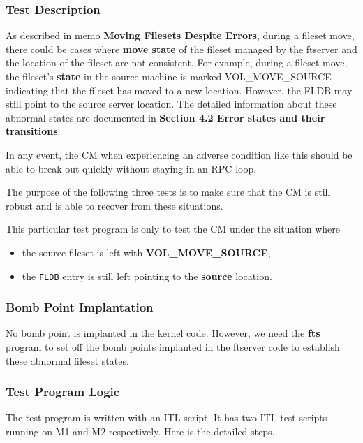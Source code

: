 \subsubsection {Test Description}

As described in memo {\bf Moving Filesets Despite Errors}, during a fileset
move, there could be cases where {\bf move state} of the fileset managed by the
ftserver and the location of the fileset are not consistent. 
For example, during a fileset move, the fileset's {\bf state } in the 
source machine is 
marked VOL_MOVE_SOURCE indicating that the fileset has moved to a new location.
However, the FLDB may still point to the source server location. 
The detailed information about these abnormal states are documented in 
{\bf Section 4.2 Error states and their transitions}.

In any event, the CM when experiencing an adverse condition like this 
should be able to break out quickly without staying in an RPC loop. 

The purpose of the following three tests is to make sure that the CM is still
robust and is able to recover from these situations.  

This particular test program is only to test the CM under the situation where 
\begin{itemize}
\item the source fileset is left with {\bf VOL_MOVE_SOURCE}, 
\item the {\tt FLDB} entry is still left pointing to the {\bf source} location.
\end{itemize}
\subsubsection {Bomb Point Implantation}

No bomb point is implanted in the kernel code. However, we need 
the {\bf fts} program to set off the bomb points implanted in the ftserver code
to establish these abnormal fileset states. 


\subsubsection {Test Program Logic}

The test program is written with an ITL script. It has two ITL test scripts
running on M1 and M2 respectively. Here is the detailed steps. 

